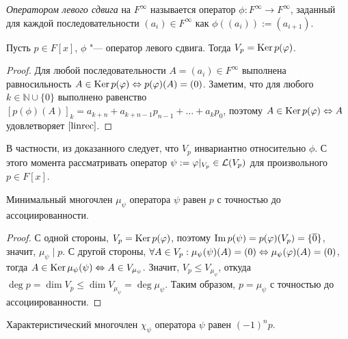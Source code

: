 \begin{definition}
	\textit{Оператором левого сдвига} на $F^\infty$ называется оператор ${\phi: F^{\infty} \rightarrow F^{\infty}}$, заданный для каждой последовательности $(a_i) \in F^{\infty}$ как $\phi((a_i)) := (a_{i + 1})$.
\end{definition}

\begin{proposition}
	Пусть $p \in F[x]$, $\phi$ "--- оператор левого сдвига. Тогда $V_p = \operatorname{Ker}{p(\varphi)}$.
\end{proposition}

\begin{proof}
	Для любой последовательности $A = (a_i) \in F^\infty$ выполнена равносильность $A \in \operatorname{Ker}{p(\varphi)} \Leftrightarrow p(\varphi)(A) = (0)$. Заметим, что для любого $k \in \mathbb{N} \cup \{0\}$ выполнено равенство $[p(\phi)(A)]_k = a_{k+n} + a_{k + n - 1}p_{n - 1} + \dots + a_kp_0$, поэтому $A \in \operatorname{Ker}{p(\varphi)} \Leftrightarrow A$ удовлетворяет $\eqref*{linrec}$.
\end{proof}

\begin{note}
	В частности, из доказанного следует, что $V_p$ инвариантно относительно $\phi$. С этого момента рассматривать оператор $\psi := \phi|_{V_p} \hm{\in} \mathcal{L}(V_p)$ для произвольного $p \in F[x]$.
\end{note}

\begin{proposition}
	Минимальный многочлен $\mu_\psi$ оператора $\psi$ равен $p$ с точностью до ассоциированности.
\end{proposition}

\begin{proof}
	С одной стороны, $V_p = \operatorname{Ker}{p(\varphi)}$, поэтому $\operatorname{Im}{p(\psi)} = p(\varphi)(V_p) = \{\overline{0}\}$, значит, $\mu_\psi\mid p$. С другой стороны, $\forall A \in V_p: \mu_\psi(\psi)(A) = (0) \hm{\Leftrightarrow} \mu_\psi(\phi)(A) = (0)$, тогда $A \in \operatorname{Ker}{\mu_\psi(\psi)} \Leftrightarrow A \in V_{\mu_{\psi}}$. Значит, $V_p \le V_{\mu_\psi}$, откуда $\deg{p} = \dim{V_p} \le \dim{V_{\mu_\psi}} = \deg{\mu_\psi}$. Таким образом, $p = \mu_\psi$ с точностью до ассоциированности.
\end{proof}

\begin{proposition}
	Характеристический многочлен $\chi_\psi$ оператора $\psi$ равен $(-1)^np$.
\end{proposition}

